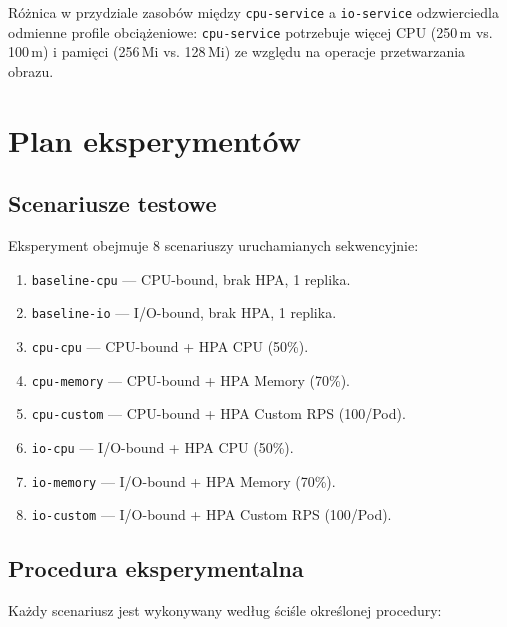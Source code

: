 Różnica w przydziale zasobów między \texttt{cpu-service} a \texttt{io-service} odzwierciedla odmienne profile obciążeniowe: \texttt{cpu-service} potrzebuje więcej CPU (250\,m vs. 100\,m) i pamięci (256\,Mi vs. 128\,Mi) ze względu na operacje przetwarzania obrazu.

\section{Plan eksperymentów}

\subsection{Scenariusze testowe}

Eksperyment obejmuje 8 scenariuszy uruchamianych sekwencyjnie:

\begin{enumerate}
  \item \texttt{baseline-cpu} — CPU-bound, brak HPA, 1 replika.
  \item \texttt{baseline-io} — I/O-bound, brak HPA, 1 replika.
  \item \texttt{cpu-cpu} — CPU-bound + HPA CPU (50\%).
  \item \texttt{cpu-memory} — CPU-bound + HPA Memory (70\%).
  \item \texttt{cpu-custom} — CPU-bound + HPA Custom RPS (100/Pod).
  \item \texttt{io-cpu} — I/O-bound + HPA CPU (50\%).
  \item \texttt{io-memory} — I/O-bound + HPA Memory (70\%).
  \item \texttt{io-custom} — I/O-bound + HPA Custom RPS (100/Pod).
\end{enumerate}

\subsection{Procedura eksperymentalna}

Każdy scenariusz jest wykonywany według ściśle określonej procedury:

